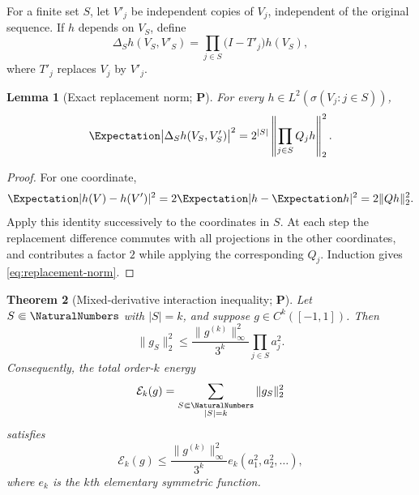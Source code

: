 \documentclass[11pt,oneside]{article}
\newtheorem{theorem}{Theorem}[section]
\newtheorem{lemma}[theorem]{Lemma}
\theoremstyle{definition}
\theoremstyle{remark}
\newcommand{\Ecal}{\mathcal E}
\newcommand{\statusP}{\textcolor{deepgreen}{\textbf{P}}}
\begin{document}
For a finite set $S$, let $V'_j$ be independent copies of $V_j$, independent
of the original sequence.  If $h$ depends on $V_S$, define
\begin{equation}
 \Delta_Sh(V_S,V'_S)
 =\prod_{j\in S}\bigl(I-T'_j\bigr)h(V_S),
 \label{eq:mixed-difference}
\end{equation}
where $T'_j$ replaces $V_j$ by $V'_j$.

\begin{lemma}[Exact replacement norm; \statusP]
\label{lem:replacement-norm}
For every $h\in L^2(\sigma(V_j:j\in S))$,
\begin{equation}
 \Expectation\bigl|\Delta_Sh(V_S,V'_S)\bigr|^2
 =2^{|S|}\left\|\prod_{j\in S}Q_jh\right\|_2^2.
 \label{eq:replacement-norm}
\end{equation}
\end{lemma}

\begin{proof}
For one coordinate,
\[
 \Expectation|h(V)-h(V')|^2=2\Expectation|h-\Expectation h|^2=2\|Qh\|_2^2.
\]
Apply this identity successively to the coordinates in $S$.  At each step the
replacement difference commutes with all projections in the other
coordinates, and contributes a factor $2$ while applying the corresponding
$Q_j$.  Induction gives \eqref{eq:replacement-norm}.
\end{proof}

\begin{theorem}[Mixed-derivative interaction inequality; \statusP]
\label{thm:smooth-interaction}
Let $S\Subset\NaturalNumbers$ with $|S|=k$, and suppose $g\in C^k([-1,1])$.  Then
\begin{equation}
 \boxed{
 \|g_S\|_2^2
 \le \frac{\|g^{(k)}\|_\infty^2}{3^k}
       \prod_{j\in S}a_j^2.}
 \label{eq:component-bound}
\end{equation}
Consequently, the total order-$k$ energy
\begin{equation}
 \Ecal_k(g)=\sum_{\substack{S\Subset\NaturalNumbers\\|S|=k}}\|g_S\|_2^2
 \label{eq:E-k-general}
\end{equation}
satisfies
\begin{equation}
 \boxed{
 \Ecal_k(g)\le
 \frac{\|g^{(k)}\|_\infty^2}{3^k}
 e_k(a_1^2,a_2^2,\ldots),}
 \label{eq:order-bound-general}
\end{equation}
where $e_k$ is the $k$th elementary symmetric function.
\end{theorem}
\end{document}
